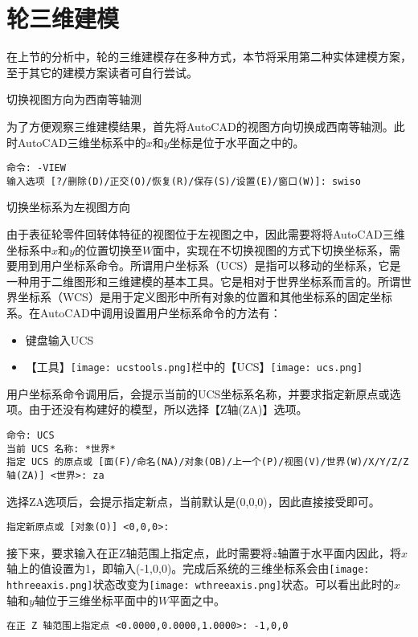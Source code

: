 \section{轮三维建模}\label{sec:lunjianmo}
在上节的分析中，轮的三维建模存在多种方式，本节将采用第二种实体建模方案，至于其它的建模方案读者可自行尝试。

\begin{procedure}
\item 切换视图方向为西南等轴测

为了方便观察三维建模结果，首先将AutoCAD的视图方向切换成西南等轴测。此时AutoCAD三维坐标系中的$x$和$y$坐标是位于水平面之中的。
\begin{lstlisting}
命令: -VIEW
输入选项 [?/删除(D)/正交(O)/恢复(R)/保存(S)/设置(E)/窗口(W)]: swiso
\end{lstlisting}

\item 切换坐标系为左视图方向

由于表征轮零件回转体特征的视图位于左视图之中，因此需要将将AutoCAD三维坐标系中$x$和$y$的位置切换至$W$面中，实现在不切换视图的方式下切换坐标系，需要用到用户坐标系命令。所谓用户坐标系（UCS）是指可以移动的坐标系，它是一种用于二维图形和三维建模的基本工具。它是相对于世界坐标系而言的。所谓世界坐标系（WCS）是用于定义图形中所有对象的位置和其他坐标系的固定坐标系。在AutoCAD中调用设置用户坐标系命令的方法有：

\begin{itemize}
\item 键盘输入UCS
\item 【工具】\texttt{[image: ucstools.png]}栏中的【UCS】\texttt{[image: ucs.png]}
\end{itemize}

用户坐标系命令调用后，会提示当前的UCS坐标系名称，并要求指定新原点或选项。由于还没有构建好的模型，所以选择【Z轴(ZA)】选项。
\begin{lstlisting}
命令: UCS
当前 UCS 名称: *世界*
指定 UCS 的原点或 [面(F)/命名(NA)/对象(OB)/上一个(P)/视图(V)/世界(W)/X/Y/Z/Z 轴(ZA)] <世界>: za
\end{lstlisting}

选择ZA选项后，会提示指定新点，当前默认是(0,0,0)，因此直接接受即可。
\begin{lstlisting}
指定新原点或 [对象(O)] <0,0,0>:
\end{lstlisting}

接下来，要求输入在正Z轴范围上指定点，此时需要将$z$轴置于水平面内因此，将$x$轴上的值设置为1，即输入(-1,0,0)。完成后系统的三维坐标系会由\texttt{[image: hthreeaxis.png]}状态改变为\texttt{[image: wthreeaxis.png]}状态。可以看出此时的$x$轴和$y$轴位于三维坐标平面中的$W$平面之中。
\begin{lstlisting}
在正 Z 轴范围上指定点 <0.0000,0.0000,1.0000>: -1,0,0
\end{lstlisting}


\end{procedure}
